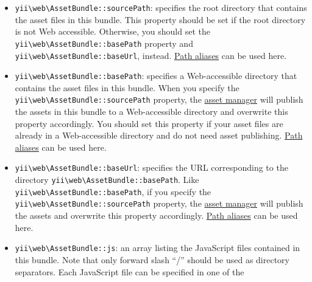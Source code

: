 \begin{itemize}
\item \texttt{yii{\allowbreak{}\textbackslash}web{\allowbreak{}\textbackslash}AssetBundle\allowbreak{}::\allowbreak{}sourcePath}: specifies the root directory that contains the asset files in
this bundle. This property should be set if the root directory is not Web accessible. Otherwise, you should
set the \texttt{yii{\allowbreak{}\textbackslash}web{\allowbreak{}\textbackslash}AssetBundle\allowbreak{}::\allowbreak{}basePath} property and \texttt{yii{\allowbreak{}\textbackslash}web{\allowbreak{}\textbackslash}AssetBundle\allowbreak{}::\allowbreak{}baseUrl}, instead.
\hyperref[concept-aliases.md]{Path aliases} can be used here.
\item \texttt{yii{\allowbreak{}\textbackslash}web{\allowbreak{}\textbackslash}AssetBundle\allowbreak{}::\allowbreak{}basePath}: specifies a Web-accessible directory that contains the asset files in
this bundle. When you specify the \texttt{yii{\allowbreak{}\textbackslash}web{\allowbreak{}\textbackslash}AssetBundle\allowbreak{}::\allowbreak{}sourcePath} property,
the \hyperref[structure-assets.md::::asset-manager]{asset manager} will publish the assets in this bundle to a Web-accessible directory
and overwrite this property accordingly. You should set this property if your asset files are already in
a Web-accessible directory and do not need asset publishing. \hyperref[concept-aliases.md]{Path aliases} can be used here.
\item \texttt{yii{\allowbreak{}\textbackslash}web{\allowbreak{}\textbackslash}AssetBundle\allowbreak{}::\allowbreak{}baseUrl}: specifies the URL corresponding to the directory
\texttt{yii{\allowbreak{}\textbackslash}web{\allowbreak{}\textbackslash}AssetBundle\allowbreak{}::\allowbreak{}basePath}. Like \texttt{yii{\allowbreak{}\textbackslash}web{\allowbreak{}\textbackslash}AssetBundle\allowbreak{}::\allowbreak{}basePath},
if you specify the \texttt{yii{\allowbreak{}\textbackslash}web{\allowbreak{}\textbackslash}AssetBundle\allowbreak{}::\allowbreak{}sourcePath} property, the \hyperref[structure-assets.md::::asset-manager]{asset manager}
will publish the assets and overwrite this property accordingly. \hyperref[concept-aliases.md]{Path aliases} can be used here.
\item \texttt{yii{\allowbreak{}\textbackslash}web{\allowbreak{}\textbackslash}AssetBundle\allowbreak{}::\allowbreak{}js}: an array listing the JavaScript files contained in this bundle. Note that only
forward slash ``/'' should be used as directory separators. Each JavaScript file can be specified in one of the

\end{itemize}
